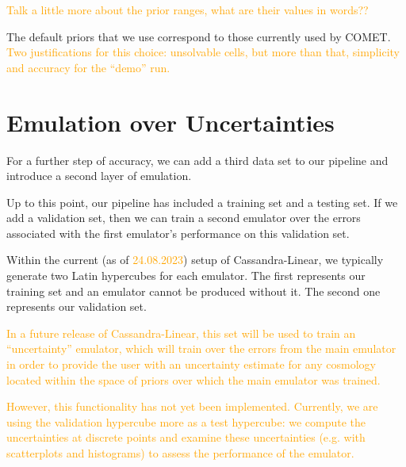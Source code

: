 \textcolor{orange}{Talk a little more about the prior ranges, what are their
values in words??}

The default priors that we use correspond to those currently used by COMET. \textcolor{orange}{Two
justifications for this choice: unsolvable cells, but more than that, simplicity and accuracy
for the ``demo'' run.}

\section{Emulation over Uncertainties}

For a further step of accuracy, we can add a third data set to our pipeline
and introduce a second layer of emulation.

Up to this point, our pipeline has included a training set and a testing set.
If we add a validation set, then we can train a second emulator over the
errors associated with the first emulator's performance on this validation
set.

Within the current (as of \textcolor{orange}{24.08.2023}) setup of
Cassandra-Linear, we typically generate two Latin hypercubes for each
emulator. The first represents our training set and an emulator cannot be
produced without it. The second one represents our validation set.

\textcolor{orange}{In a future
release of Cassandra-Linear, this set will be used to train an ``uncertainty''
emulator, which will train over the errors from the main emulator in order to
provide the user with an uncertainty estimate for any cosmology located within
the space of priors over which the main emulator was trained.} 

\textcolor{orange}{However, this functionality has not yet been implemented. 
Currently, we are 
using the validation hypercube more as a test hypercube: we compute the uncertainties at discrete points and examine these uncertainties (e.g. with
scatterplots and histograms) to assess the performance of the emulator.}
